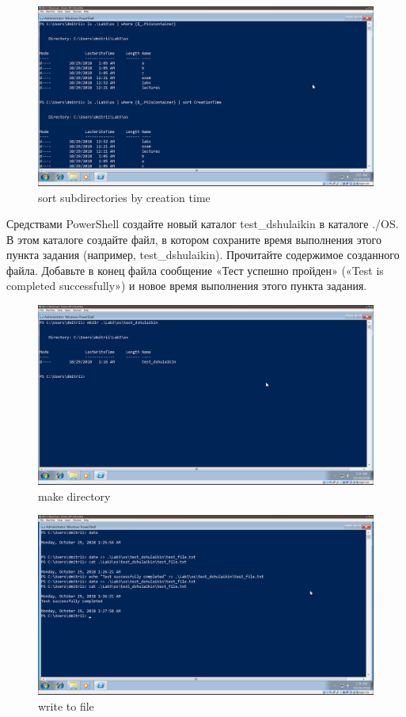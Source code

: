 \documentclass[a4paper]{article}
\begin{document}
\begin{figure}[H]
    \centering
    \includegraphics[width=\linewidth]{18-3.png}
    \caption{ sort subdirectories by creation time }
\end{figure}

Средствами PowerShell создайте новый каталог test\_dshulaikin в каталоге ./OS. В этом каталоге создайте файл, в котором сохраните время выполнения этого пункта задания (например, test\_dshulaikin). Прочитайте содержимое созданного файла. Добавьте в конец файла сообщение «Тест успешно пройден» («Test is completed successfully») и новое время выполнения этого пункта задания.

\begin{figure}[H]
    \centering
    \includegraphics[width=\linewidth]{20.png}
    \caption{ make directory }
\end{figure}


\begin{figure}[H]
    \centering
    \includegraphics[width=\linewidth]{24.png}
    \caption{ write to file }
\end{figure}
\end{document}
